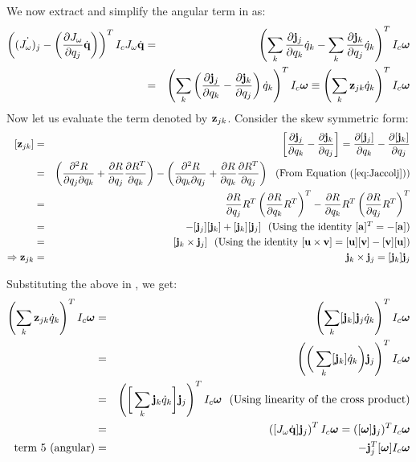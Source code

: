 We now extract and simplify the angular term in  as:
\begin{eqnarray}
\label{eq:term5_ang}
\nonumber
\left( \dot{(J_\omega)_j}  - \left(\frac{\partial J_\omega}{\partial q_j}\dot{\mathbf{q}}\right) \right )^T I_c J_\omega \dot{\mathbf{q}} & = & \left( \sum_k \frac{\partial \mathbf{j}_j}{\partial q_k}\dot{q}_k -  \sum_k \frac{\partial \mathbf{j}_k}{\partial q_j} \dot{q}_k \right )^T I_c \bm{\omega}\\
& = & \left( \sum_k \left ( \frac{\partial \mathbf{j}_j}{\partial q_k}  -  \frac{\partial \mathbf{j}_k}{\partial q_j}\right ) \dot{q}_k \right )^T I_c \bm{\omega} \equiv \left ( \sum_k \mathbf{z}_{jk} \dot{q}_k \right )^T I_c\bm{\omega} 
\end{eqnarray}
Now let us evaluate the term denoted by $\mathbf{z}_{jk}$. Consider the skew symmetric form:
\begin{eqnarray}
\nonumber
[\vc{z}_{jk}] & = & \left [ \frac{\partial \vc{j}_j}{\partial q_k}  -  \frac{\partial \vc{j}_k}{\partial q_j} \right ] = \frac{\partial [\vc{j}_j]}{\partial q_k}  -  \frac{\partial [\vc{j}_k]}{\partial q_j}\\
\nonumber
& = & \left ( \frac{\partial^2 R}{\partial q_j \partial q_k} + \frac{\partial R}{\partial q_j} \frac{\partial R^T}{\partial q_k} \right ) - \left ( \frac{\partial^2 R}{\partial q_k \partial q_j} + \frac{\partial R}{\partial q_k} \frac{\partial R^T}{\partial q_j} \right ) \mbox{\ \ (From \eqnref{Jaccolj})}\\
\nonumber
& = & \frac{\partial R}{\partial q_j}R^T \left( \frac{\partial R}{\partial q_k}R^T\right)^T - \frac{\partial R}{\partial q_k}R^T \left( \frac{\partial R}{\partial q_j}R^T\right)^T\\
\nonumber
& = & -[\vc{j}_j][\vc{j}_k] + [\vc{j}_k][\vc{j}_j] \mbox{\ \ (Using the identity $[\vc{a}]^T = -[\vc{a}]$)}\\
\nonumber
& = & [\vc{j}_k\times \vc{j}_j] \mbox{\ \ (Using the identity $[\vc{u}\times \vc{v}] = [\vc{u}][\vc{v}] - [\vc{v}][\vc{u}]$)}\\
\Rightarrow \vc{z}_{jk} & = & \vc{j}_k\times \vc{j}_j = [\vc{j}_k] \vc{j}_j
\end{eqnarray}

Substituting the above in , we get:
\begin{eqnarray}
\label{eq:term5_ang_final}
\nonumber
\left ( \sum_k \mathbf{z}_{jk} \dot{q}_k \right )^T I_c\bm{\omega}  & = & \left ( \sum_k [\mathbf{j}_k] \mathbf{j}_j \dot{q}_k \right )^T I_c\bm{\omega} \\
\nonumber
& = & \left ( \bigg ( \sum_k [\mathbf{j}_k]\dot{q}_k \bigg ) \mathbf{j}_j \right )^T I_c\bm{\omega}\\
\nonumber
& = & \left ( \bigg [ \sum_k \mathbf{j}_k \dot{q}_k \bigg ] \mathbf{j}_j \right )^T I_c\bm{\omega} \mbox{\ \ (Using linearity of the cross product)}\\
\nonumber
& = & \left ( [ J_\omega \dot{\mathbf{q}} ] \mathbf{j}_j \right )^T I_c\bm{\omega} = ([\bm{\omega}]\mathbf{j}_j)^TI_c\bm{\omega}\\
\mbox{term 5 (angular)} & = & -\mathbf{j}_j^T [\bm{\omega}] I_c\bm{\omega}
\end{eqnarray} 

